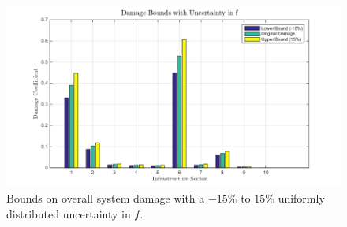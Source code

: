 \documentclass[11pt,a4paper]{article}
\begin{document}
\begin{figure}[H]
	\centering
	\includegraphics[width=1\textwidth]
    {damage_bounds_uncertainty_f.png}
    \caption{Bounds on overall system damage with a $-15\%$ to $15\%$ uniformly distributed uncertainty in $f$.}
    \label{fig: Damage Bounds f}
\end{figure}
\end{document}
